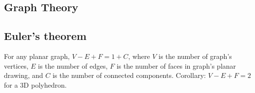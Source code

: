 \documentclass[12pt]{extarticle}
\begin{document}
\begin{multicols*}{2}


\section{Graph Theory}

\subsection{Euler's theorem} For any planar graph, $V - E + F = 1 + C$,
where $V$ is the number of graph's vertices, $E$ is the number of edges,
$F$ is the number of faces in graph's planar drawing, and $C$ is the number
of connected components.  Corollary: $V - E + F = 2$ for a 3D polyhedron.





\end{multicols*}
\end{document}
